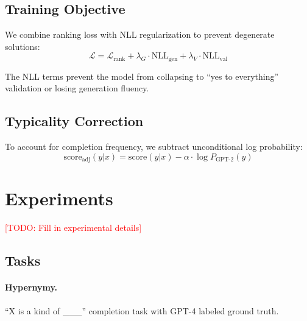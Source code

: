 \documentclass{article}
\newcommand{\todo}[1]{\textcolor{red}{[TODO: #1]}}
\begin{document}
\subsection{Training Objective}

We combine ranking loss with NLL regularization to prevent degenerate solutions:
\begin{equation}
    \mathcal{L} = \mathcal{L}_{\text{rank}} + \lambda_G \cdot \text{NLL}_{\text{gen}} + \lambda_V \cdot \text{NLL}_{\text{val}}
\end{equation}

The NLL terms prevent the model from collapsing to ``yes to everything'' validation or losing generation fluency.

\subsection{Typicality Correction}

To account for completion frequency, we subtract unconditional log probability:
\begin{equation}
    \text{score}_{\text{adj}}(y|x) = \text{score}(y|x) - \alpha \cdot \log P_{\text{GPT-2}}(y)
\end{equation}


\section{Experiments}
\label{sec:experiments}

\todo{Fill in experimental details}

\subsection{Tasks}







\paragraph{Hypernymy.}
``X is a kind of \_\_\_'' completion task with GPT-4 labeled ground truth.
\end{document}
